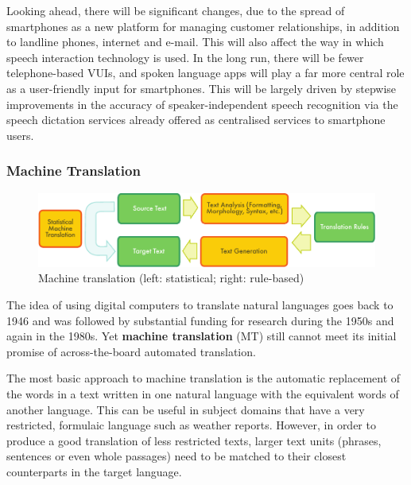 \begin{multicols}{2}

Looking ahead, there will be significant changes, due to the spread of smartphones as a new platform for managing customer relationships, in addition to landline phones, internet and e-mail. This will also affect the way in which speech interaction technology is used. In the long run, there will be fewer telephone-based VUIs, and spoken language apps will play a far more central role as a user-friendly input for smartphones. This will be largely driven by stepwise improvements in the accuracy of speaker-independent speech recognition via the speech dictation services already offered as centralised services to smartphone users.

\subsubsection{Machine Translation}

\begin{figure}[htb]
  \center
  \includegraphics[width=\textwidth]{../_media/english/machine_translation}
  \caption{Machine translation (left: statistical; right: rule-based)}
  \label{fig:mtarch_en}
  \vspace{-15mm}
\end{figure}

The idea of using digital computers to translate natural languages goes back to 1946 and was followed by substantial funding for research during the 1950s and again in the 1980s. Yet \textbf{machine translation} (MT) still cannot meet its initial promise of across-the-board automated translation. 

The most basic approach to machine translation is the automatic replacement of the words in a text written in one natural language with the equivalent words of another language. This can be useful in subject domains that have a very restricted, formulaic language such as weather reports.
However, in order to produce a good translation of less restricted texts, larger text units (phrases, sentences or even whole passages) need to be matched to their closest counterparts in the target language.


\end{multicols}
